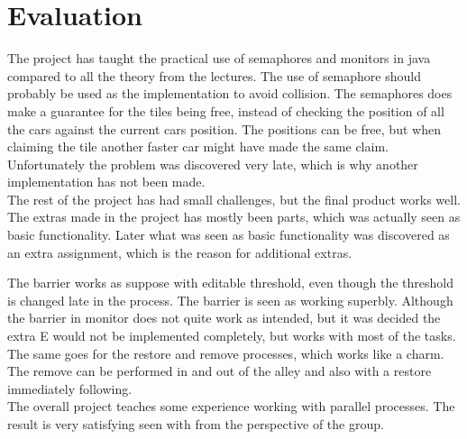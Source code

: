 \section{Evaluation}
The project has taught the practical use of semaphores and monitors in java compared to all the theory from the lectures. The use of semaphore should probably be used as the implementation to avoid collision. The semaphores does make a guarantee for the tiles being free, instead of checking the position of all the cars against the current cars position. The positions can be free, but when claiming the tile another faster car might have made the same claim. Unfortunately the problem was discovered very late, which is why another implementation has not been made.
\\

The rest of the project has had small challenges, but the final product works well. The extras made in the project has mostly been parts, which was actually seen as basic functionality. Later what was seen as basic functionality was discovered as an extra assignment, which is the reason for additional extras. 

The barrier works as suppose with editable threshold, even though the threshold is changed late in the process. The barrier is seen as working superbly. Although the barrier in monitor does not quite work as intended, but it was decided the extra E would not be implemented completely, but works with most of the tasks.  The same goes for the restore and remove processes, which works like a charm. The remove can be performed in and out of the alley and also with a restore immediately following.
\\

The overall project teaches some experience working with parallel processes. The result is very satisfying seen with from the perspective of the group.